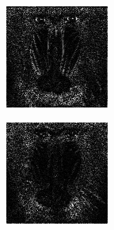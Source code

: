 \begin{figure}
\begin{subfigure}{0.4\textwidth}
       \end{subfigure}%
    \hfill
        \begin{subfigure}{0.4\textwidth}\centering
                    \includegraphics[width=\linewidth]{figures/mandrill3.png}
       \end{subfigure}%
        \begin{subfigure}{0.4\textwidth}\centering
                    \includegraphics[width=\linewidth]{figures/mandrill4.png}

\end{subfigure}
\end{figure}

